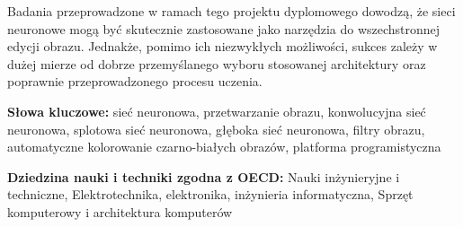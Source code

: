   Badania przeprowadzone w ramach tego projektu dyplomowego dowodzą, że
  sieci neuronowe mogą być skutecznie zastosowane jako narzędzia do wszechstronnej
  edycji obrazu. Jednakże, pomimo ich niezwykłych możliwości, sukces
  zależy w dużej mierze od dobrze przemyślanego
  wyboru stosowanej architektury oraz poprawnie przeprowadzonego
  procesu uczenia.

  \bigskip

  \noindent\textbf{Słowa kluczowe:} sieć neuronowa, przetwarzanie obrazu,
  konwolucyjna sieć neuronowa, splotowa sieć neuronowa,
  głęboka sieć neuronowa, filtry obrazu, automatyczne kolorowanie czarno-białych
  obrazów, platforma programistyczna

  \bigskip

  \noindent\textbf{Dziedzina nauki i techniki zgodna z OECD:} Nauki
  inżynieryjne i techniczne, Elektrotechnika, elektronika, inżynieria
  informatyczna, Sprzęt komputerowy i architektura komputerów
